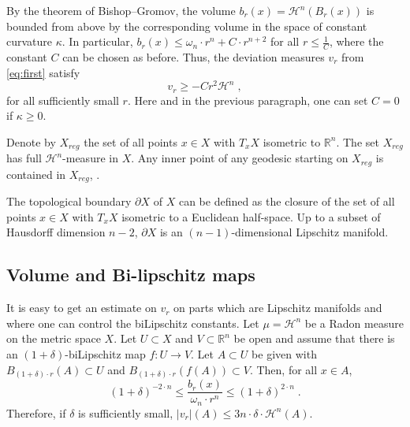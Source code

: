 \documentclass[12pt,leqno,intlimits]{amsart}
\numberwithin{equation}{section}
\theoremstyle{definition}
\theoremstyle{remark}
\newcommand{\R}{\mathbb{R}}
\def\:{\colon}
\begin{document}
By the theorem of Bishop--Gromov, the volume $b_r (x)=\mathcal H^n (B_r(x))$ is bounded from above by the corresponding volume in the
space of constant curvature $\kappa$. In particular, $b_r (x) \leq \omega _n \cdot r^n + C \cdot r^{n+2}$ for all $r\leq \frac 1 C$, where
the constant $C$ can be chosen as before.  Thus, the deviation measures  $v_r $ from \eqref{eq:first} satisfy
$$v_r \geq -Cr^2 \mathcal H^n \; ,$$  for all sufficiently small $r$.
 Here and in the previous paragraph,  one can set $C=0$ if $\kappa \geq 0$.



Denote by $X_{reg}$ the set of all points $x\in X$ with $T_xX$   isometric to $\R^n$.  The set $X_{reg}$ has full $\mathcal H^n$-measure in $X$.
Any inner point of any geodesic starting on $X_{reg}$ is contained in $X_{reg}$, \cite{Petparallel}.


The topological boundary $\partial X$ of $X$ can be defined as the closure of the  set of all points $x\in X$ with $T_xX$ isometric to a Euclidean half-space. Up to a subset of Hausdorff dimension $n-2$, $\partial X$ is an $(n-1)$-dimensional Lipschitz manifold.


\subsection{Volume and Bi-lipschitz maps}
It is easy to get an estimate on $v_r$  on parts which are Lipschitz manifolds and where one can control the biLipschitz constants.
Let $\mu =\mathcal H^n$ be a Radon measure on the metric space $X$.
Let $U\subset X$ and $V\subset \R^n$ be open and assume that there is an $(1+\delta)$-biLipschitz map
$f\:U \to V$.  %
 Let $A\subset U$ be given with
$B_{(1+\delta) \cdot  r} (A) \subset U$ and $B_{(1+\delta) \cdot r} (f(A)) \subset V$.  Then, for all $x\in A$,
\begin{equation} \label{eq:bilip}
(1+\delta)  ^{-2\cdot n} \leq \frac {b_r(x)} {\omega _n \cdot  r^n} \leq (1+\delta ) ^{2\cdot n} \; .
\end{equation}
Therefore, if $\delta $ is sufficiently small,  $|v_r | (A) \leq  3 n \cdot   \delta \cdot \mathcal H^n (A).$
\end{document}
